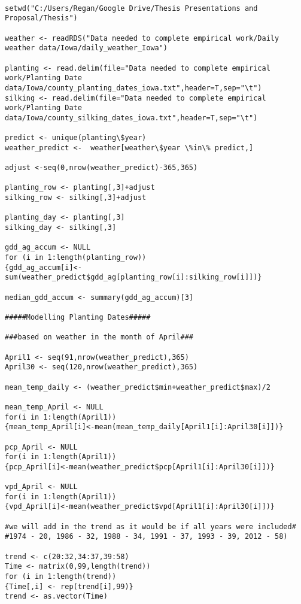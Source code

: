 \begin{lstlisting}

setwd("C:/Users/Regan/Google Drive/Thesis Presentations and Proposal/Thesis")

weather <- readRDS("Data needed to complete empirical work/Daily weather data/Iowa/daily_weather_Iowa")

planting <- read.delim(file="Data needed to complete empirical work/Planting Date data/Iowa/county_planting_dates_iowa.txt",header=T,sep="\t")
silking <- read.delim(file="Data needed to complete empirical work/Planting Date data/Iowa/county_silking_dates_iowa.txt",header=T,sep="\t")

predict <- unique(planting\$year)
weather_predict <-  weather[weather\$year \%in\% predict,]

adjust <-seq(0,nrow(weather_predict)-365,365)

planting_row <- planting[,3]+adjust
silking_row <- silking[,3]+adjust

planting_day <- planting[,3]
silking_day <- silking[,3]

gdd_ag_accum <- NULL
for (i in 1:length(planting_row))
{gdd_ag_accum[i]<-sum(weather_predict$gdd_ag[planting_row[i]:silking_row[i]])}

median_gdd_accum <- summary(gdd_ag_accum)[3]

#####Modelling Planting Dates#####

###based on weather in the month of April###

April1 <- seq(91,nrow(weather_predict),365)
April30 <- seq(120,nrow(weather_predict),365)

mean_temp_daily <- (weather_predict$min+weather_predict$max)/2

mean_temp_April <- NULL
for(i in 1:length(April1))
{mean_temp_April[i]<-mean(mean_temp_daily[April1[i]:April30[i]])}

pcp_April <- NULL
for(i in 1:length(April1))
{pcp_April[i]<-mean(weather_predict$pcp[April1[i]:April30[i]])}

vpd_April <- NULL
for(i in 1:length(April1))
{vpd_April[i]<-mean(weather_predict$vpd[April1[i]:April30[i]])}

#we will add in the trend as it would be if all years were included#
#1974 - 20, 1986 - 32, 1988 - 34, 1991 - 37, 1993 - 39, 2012 - 58)

trend <- c(20:32,34:37,39:58)
Time <- matrix(0,99,length(trend))
for (i in 1:length(trend))
{Time[,i] <- rep(trend[i],99)}
trend <- as.vector(Time)


\end{lstlisting}
